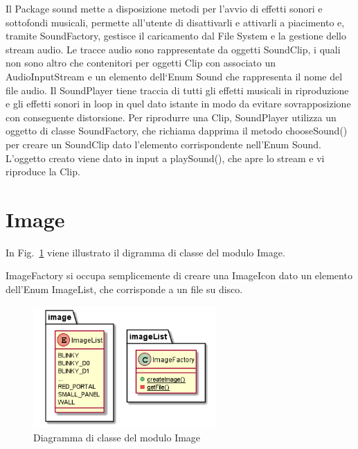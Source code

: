 \documentclass[12pt,a4paper]{report}
\begin{document}
Il Package sound mette a disposizione metodi per l’avvio di effetti sonori e sottofondi musicali, permette all’utente di disattivarli e attivarli a piacimento e, tramite SoundFactory, gestisce il caricamento dal File System e la gestione dello stream audio.
Le tracce audio sono rappresentate da oggetti SoundClip, i quali non sono altro che contenitori per oggetti Clip con associato un AudioInputStream e un elemento dell`Enum Sound che rappresenta il nome del file audio.
Il SoundPlayer tiene traccia di tutti gli effetti musicali in riproduzione e gli effetti sonori in loop in quel dato istante in modo da evitare sovrapposizione con conseguente distorsione.
Per riprodurre una Clip, SoundPlayer utilizza un oggetto di classe SoundFactory, che richiama dapprima il metodo chooseSound() per creare un SoundClip dato l’elemento corrispondente nell’Enum Sound. L’oggetto creato viene dato in input a playSound(), che apre lo stream e vi riproduce la Clip.\newpage



\section{Image}\label{se:arch.image}
In Fig.~\ref{fig:image} viene illustrato il digramma di classe del modulo Image.\newline

ImageFactory si occupa semplicemente di creare una ImageIcon dato un elemento dell’Enum ImageList, che corrisponde a un file su disco.

\begin{figure}[tb]
\begin{center}
  \includegraphics[width=7cm]{image}
\end{center}
  \caption{Diagramma di classe del modulo Image}
  \label{fig:image}
\end{figure}

\end{document}
